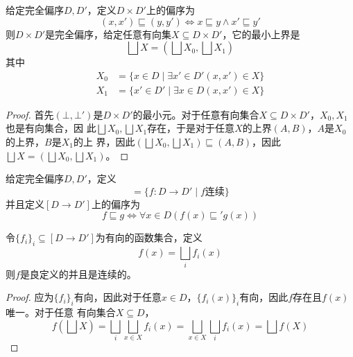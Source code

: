 \documentclass[11pt]{article}
\begin{document}
\begin{proposition}[]
给定完全偏序\(D,D'\)，定义\(D\times D'\)上的偏序为
\begin{equation*}
(x,x')\sqsubseteq(y,y')\Leftrightarrow x\sqsubseteq y\wedge x'\sqsubseteq y'
\end{equation*}
则\(D\times D'\)是完全偏序，给定任意有向集\(X\subseteq D\times D'\)，它的最小上界是
\begin{equation*}
\bigsqcup X=(\bigsqcup X_0,\bigsqcup X_1)
\end{equation*}
其中
\begin{align*}
X_0&=\{x\in D\mid\exists x'\in  D'(x,x')\in X\}\\
X_1&=\{x'\in D'\mid\exists x\in D(x,x')\in X\}
\end{align*}
\end{proposition}

\begin{proof}
首先\((\bot,\bot')\)是\(D\times D'\)的最小元。对于任意有向集合\(X\subseteq D\times D'\)，\(X_0,X_1\)也是有向集合，因
此\(\bigsqcup X_0,\bigsqcup X_1\)存在，于是对于任意\(X\)的上界\((A,B)\)，\(A\)是\(X_0\)的上界，\(B\)是\(X_1\)的上
界，因此\((\bigsqcup X_0,\bigsqcup X_1)\sqsubseteq(A,B)\)，因此\(\bigsqcup X=(\bigsqcup X_0,\bigsqcup X_1)\)。
\end{proof}


\begin{definition}[]
给定完全偏序\(D,D'\)，定义
\begin{equation*}
[D\to D']=\{f:D\to D'\mid f\text{连续}\}
\end{equation*}
并且定义\([D\to D']\)上的偏序为
\begin{equation*}
f\sqsubseteq g\Leftrightarrow\forall x\in D(f(x)\sqsubseteq'g(x))
\end{equation*}
\end{definition}

\begin{lemma}[]
\label{1.2.10}
令\(\{f_i\}_i\subseteq[D\to D']\)为有向的函数集合，定义
\begin{equation*}
f(x)=\bigsqcup_if_i(x)
\end{equation*}
则\(f\)是良定义的并且是连续的。
\end{lemma}

\begin{proof}
应为\(\{f_i\}_i\)有向，因此对于任意\(x\in D\)，\(\{f_i(x)\}_i\)有向，因此\(f\)存在且\(f(x)\)唯一。对于任意
有向集合\(X\subseteq D\)，
\begin{equation*}
f(\bigsqcup X)=\bigsqcup_i\bigsqcup_{x\in X}f_i(x)=\bigsqcup_{x\in X}\bigsqcup_if_i(x)=\bigsqcup f(X)
\end{equation*}
\end{proof}
\end{document}
